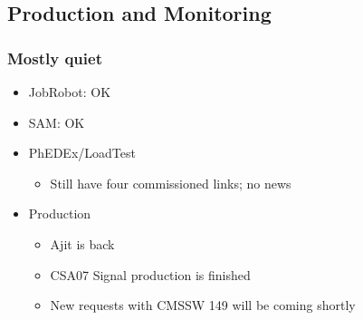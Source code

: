 \documentclass{beamer}
\begin{document}
\subsection{Production and Monitoring}
\begin{frame}
\frametitle{Mostly quiet}
\begin{itemize}
    \item JobRobot: OK
    \item SAM: OK
    \item PhEDEx/LoadTest
    \begin{itemize}
        \item Still have four commissioned links; no news
    \end{itemize}
    \item Production
    \begin{itemize}
        \item Ajit is back
        \item CSA07 Signal production is finished
        \item New requests with CMSSW 149 will be coming shortly
    \end{itemize}
\end{itemize}
\end{frame}
\end{document}
